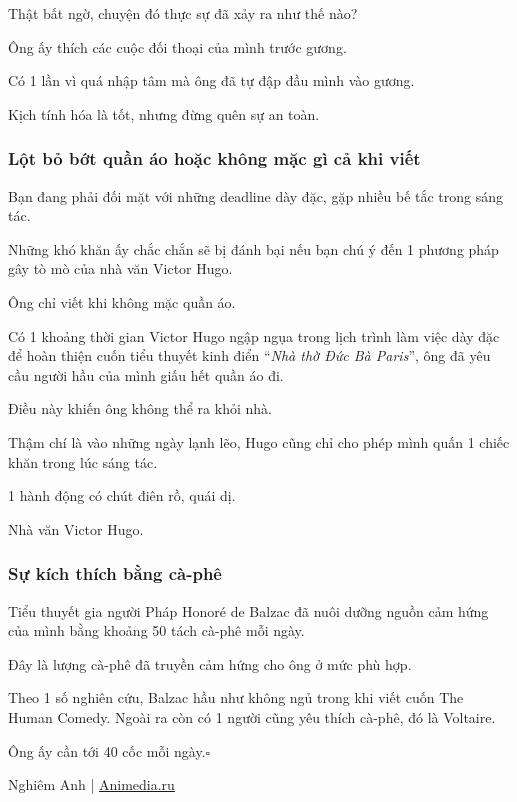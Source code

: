 \documentclass{article}
\begin{document}
Thật bất ngờ, chuyện đó thực sự đã xảy ra như thế nào?

Ông ấy thích các cuộc đối thoại của mình trước gương.

Có 1 lần vì quá nhập tâm mà ông đã tự đập đầu mình vào gương.

Kịch tính hóa là tốt, nhưng đừng quên sự an toàn.

\subsubsection{Lột bỏ bớt quần áo hoặc không mặc gì cả khi viết}
Bạn đang phải đối mặt với những deadline dày đặc, gặp nhiều bế tắc trong sáng tác.

Những khó khăn ấy chắc chắn sẽ bị đánh bại nếu bạn chú ý đến 1 phương pháp gây tò mò của nhà văn Victor Hugo.

Ông chỉ viết khi không mặc quần áo.

Có 1 khoảng thời gian Victor Hugo ngập ngụa trong lịch trình làm việc dày đặc để hoàn thiện cuốn tiểu thuyết kinh điển ``\textit{Nhà thờ Đức Bà Paris}'', ông đã yêu cầu người hầu của mình giấu hết quần áo đi.

Điều này khiến ông không thể ra khỏi nhà.

Thậm chí là vào những ngày lạnh lẽo, Hugo cũng chỉ cho phép mình quấn 1 chiếc khăn trong lúc sáng tác.

1 hành động có chút điên rồ, quái dị.

\textsf{Nhà văn Victor Hugo.}

\subsubsection{Sự kích thích bằng cà-phê}
Tiểu thuyết gia người Pháp Honoré de Balzac đã nuôi dưỡng nguồn cảm hứng của mình bằng khoảng 50 tách cà-phê mỗi ngày.

Đây là lượng cà-phê đã truyền cảm hứng cho ông ở mức phù hợp.

Theo 1 số nghiên cứu, Balzac hầu như không ngủ trong khi viết cuốn The Human Comedy. Ngoài ra còn có 1 người cũng yêu thích cà-phê, đó là Voltaire.

Ông ấy cần tới 40 cốc mỗi ngày.\hfill$\square$

\begin{flushright}
	Nghiêm Anh | \url{Animedia.ru}
\end{flushright}

\end{document}
